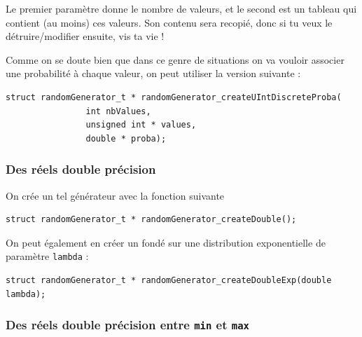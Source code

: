    Le premier paramètre donne le nombre de valeurs, et le second est
un tableau qui contient (au moins) ces valeurs. Son contenu sera
recopié, donc si tu veux le détruire/modifier ensuite, vis ta vie !

   Comme on se doute bien que dans ce genre de situations on va
vouloir associer une probabilité à chaque valeur, on peut utiliser la
version suivante :

\begin{verbatim}
struct randomGenerator_t * randomGenerator_createUIntDiscreteProba(
				int nbValues,
				unsigned int * values,
				double * proba);
\end{verbatim}

%
\subsubsection{Des réels double précision}

   On crée un tel générateur avec la fonction suivante

\begin{verbatim}
struct randomGenerator_t * randomGenerator_createDouble();
\end{verbatim}

   On peut également en créer un fondé sur une distribution
exponentielle de paramètre {\tt lambda} :

\begin{verbatim}
struct randomGenerator_t * randomGenerator_createDoubleExp(double lambda);
\end{verbatim}

%
\subsubsection{Des réels double précision entre {\tt min} et {\tt max}}

\begin{verbatim}
\end{verbatim}

%
